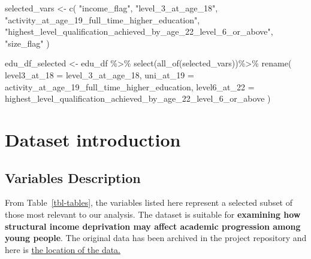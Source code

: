 \documentclass[11pt,en]{../tex/elegantpaper}
\newenvironment{Shaded}{\begin{snugshade}}{\end{snugshade}}
\newcommand{\AttributeTok}[1]{\textcolor[rgb]{0.77,0.63,0.00}{#1}}
\newcommand{\FunctionTok}[1]{\textcolor[rgb]{0.00,0.00,0.81}{#1}}
\newcommand{\NormalTok}[1]{#1}
\newcommand{\OtherTok}[1]{\textcolor[rgb]{0.50,0.00,0.50}{#1}}
\newcommand{\SpecialCharTok}[1]{\textcolor[rgb]{0.00,0.00,0.00}{#1}}
\newcommand{\StringTok}[1]{\textcolor[rgb]{0.31,0.60,0.02}{#1}}
\begin{document}
\begin{Shaded}
\begin{Highlighting}[]
\NormalTok{selected\_vars }\OtherTok{\textless{}{-}} \FunctionTok{c}\NormalTok{( }
  \StringTok{"income\_flag"}\NormalTok{,}
  \StringTok{"level\_3\_at\_age\_18"}\NormalTok{,}
  \StringTok{"activity\_at\_age\_19\_full\_time\_higher\_education"}\NormalTok{,}
  \StringTok{"highest\_level\_qualification\_achieved\_by\_age\_22\_level\_6\_or\_above"}\NormalTok{,}
  \StringTok{"size\_flag"}
\NormalTok{)}

\NormalTok{edu\_df\_selected }\OtherTok{\textless{}{-}}\NormalTok{ edu\_df }\SpecialCharTok{\%\textgreater{}\%}
  \FunctionTok{select}\NormalTok{(}\FunctionTok{all\_of}\NormalTok{(selected\_vars))}\SpecialCharTok{\%\textgreater{}\%}
  \FunctionTok{rename}\NormalTok{(}
    \AttributeTok{level3\_at\_18 =}\NormalTok{ level\_3\_at\_age\_18,}
    \AttributeTok{uni\_at\_19 =}\NormalTok{ activity\_at\_age\_19\_full\_time\_higher\_education,}
    \AttributeTok{level6\_at\_22 =}\NormalTok{ highest\_level\_qualification\_achieved\_by\_age\_22\_level\_6\_or\_above}
\NormalTok{  )}
\end{Highlighting}
\end{Shaded}

\section{Dataset introduction}\label{dataset-introduction}

\subsection{Variables Description}\label{variables-description}

From Table~\ref{tbl-tables}, the variables listed here represent a
selected subset of those most relevant to our analysis. The dataset is
suitable for \textbf{examining how structural income deprivation may
affect academic progression among young people}. The original data has
been archived in the project repository and here is
\href{data/english_education.csv}{the location of the data.}
\end{document}
